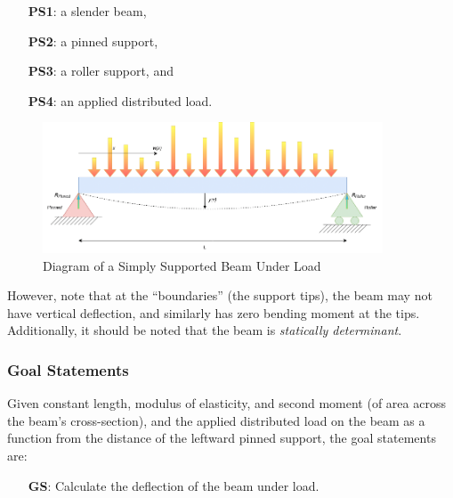 \documentclass[12pt]{article}
\newcounter{goalnum} %
\begin{document}
\begin{itemize}

    \item[\textbf{PS1}:] a slender beam,

    \item[\textbf{PS2}:] a pinned support,

    \item[\textbf{PS3}:] a roller support, and

    \item[\textbf{PS4}:] an applied distributed load.

\end{itemize}

\begin{figure}[H]
    \begin{center}
        \includegraphics[width=0.9\textwidth]{temp/beam_bending_diagram_annotated.drawio.png}
        \caption{\label{beam_bending_diagram_annotated} Diagram of a Simply Supported Beam Under Load}
    \end{center}
\end{figure}

\noindent{}However, note that at the ``boundaries'' (the support tips), the beam
may not have vertical deflection, and similarly has zero bending moment at the
tips. Additionally, it should be noted that the beam is \textit{statically
    determinant}.

\subsubsection{Goal Statements}
\label{sssec_goals}

\noindent{}Given constant length, modulus of elasticity, and second moment (of
area across the beam's cross-section), and the applied distributed load on the
beam as a function from the distance of the leftward pinned support, the goal
statements are:

\begin{itemize}

    \item[\refstepcounter{goalnum}\textbf{GS\thegoalnum{}}\label{deflection}:]
        Calculate the deflection of the beam under load.

\end{itemize}
\end{document}
